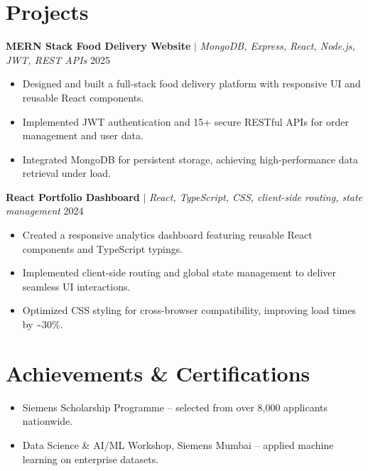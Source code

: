 \documentclass[letterpaper,11pt]{article}
\newcommand{\resumeItem}[1]{\item\small{#1}}
\begin{document}
\section*{Projects}
\textbf{MERN Stack Food Delivery Website} $|$ \textit{\small MongoDB, Express, React, Node.js, JWT, REST APIs} \hfill \small 2025 \\
\begin{itemize}
  \resumeItem{Designed and built a full-stack food delivery platform with responsive UI and reusable React components.}
  \resumeItem{Implemented JWT authentication and 15+ secure RESTful APIs for order management and user data.}
  \resumeItem{Integrated MongoDB for persistent storage, achieving high-performance data retrieval under load.}
\end{itemize}
\textbf{React Portfolio Dashboard} $|$ \textit{\small React, TypeScript, CSS, client-side routing, state management} \hfill \small 2024 \\
\begin{itemize}
  \resumeItem{Created a responsive analytics dashboard featuring reusable React components and TypeScript typings.}
  \resumeItem{Implemented client-side routing and global state management to deliver seamless UI interactions.}
  \resumeItem{Optimized CSS styling for cross-browser compatibility, improving load times by \textasciitilde{}30\%.}
\end{itemize}
\section*{Achievements \& Certifications}
\begin{itemize}
  \resumeItem{Siemens Scholarship Programme -- selected from over 8,000 applicants nationwide.}
  \resumeItem{Data Science \& AI/ML Workshop, Siemens Mumbai -- applied machine learning on enterprise datasets.}
\end{itemize}
\end{document}
